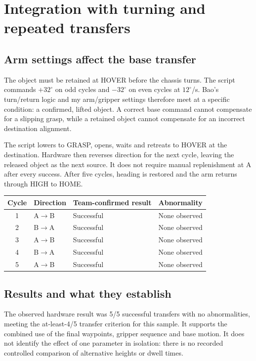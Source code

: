 \section{Integration with turning and repeated transfers}
\subsection{Arm settings affect the base transfer}
The object must be retained at HOVER before the chassis turns. The script commands $+32^\circ$ on odd cycles and $-32^\circ$ on even cycles at $12^\circ$/s. Bao's turn/return logic and my arm/gripper settings therefore meet at a specific condition: a confirmed, lifted object. A correct base command cannot compensate for a slipping grasp, while a retained object cannot compensate for an incorrect destination alignment.

The script lowers to GRASP, opens, waits and retreats to HOVER at the destination. Hardware then reverses direction for the next cycle, leaving the released object as the next source. It does not require manual replenishment at A after every success. After five cycles, heading is restored and the arm returns through HIGH to HOME.
\begin{center}
\begin{tabular}{@{}clll@{}}\toprule
Cycle & Direction & Team-confirmed result & Abnormality\\\midrule
1 & A$\rightarrow$B & Successful & None observed\\
2 & B$\rightarrow$A & Successful & None observed\\
3 & A$\rightarrow$B & Successful & None observed\\
4 & B$\rightarrow$A & Successful & None observed\\
5 & A$\rightarrow$B & Successful & None observed\\\bottomrule
\end{tabular}
\end{center}
\subsection{Results and what they establish}
The observed hardware result was 5/5 successful transfers with no abnormalities, meeting the at-least-4/5 transfer criterion for this sample. It supports the combined use of the final waypoints, gripper sequence and base motion. It does not identify the effect of one parameter in isolation: there is no recorded controlled comparison of alternative heights or dwell times.

